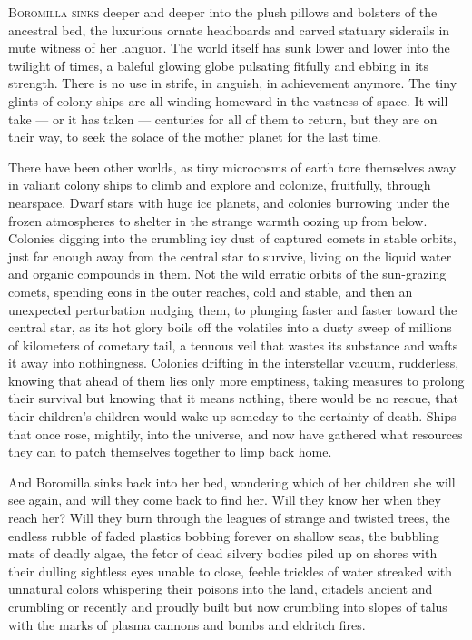 
\lettrine{B}{oromilla sinks} deeper and deeper into the plush pillows and bolsters of
the ancestral bed, the luxurious ornate headboards and carved statuary
siderails in mute witness of her languor. The world itself has sunk
lower and lower into the twilight of times, a baleful glowing globe
pulsating fitfully and ebbing in its strength. There is no use in
strife, in anguish, in achievement anymore. The tiny glints of colony
ships are all winding homeward in the vastness of space. It will take ---
or it has taken --- centuries for all of them to return, but they are on
their way, to seek the solace of the mother planet for the last time.

There have been other worlds, as tiny microcosms of earth tore
themselves away in valiant colony ships to climb and explore and
colonize, fruitfully, through nearspace. Dwarf stars with huge ice
planets, and colonies burrowing under the frozen atmospheres to shelter
in the strange warmth oozing up from below. Colonies digging into the
crumbling icy dust of captured comets in stable orbits, just far enough
away from the central star to survive, living on the liquid water and
organic compounds in them. Not the wild erratic orbits of the
sun-grazing comets, spending eons in the outer reaches, cold and stable,
and then an unexpected perturbation nudging them, to plunging faster and
faster toward the central star, as its hot glory boils off the volatiles
into a dusty sweep of millions of kilometers of cometary tail, a tenuous
veil that wastes its substance and wafts it away into nothingness.
Colonies drifting in the interstellar vacuum, rudderless, knowing that
ahead of them lies only more emptiness, taking measures to prolong their
survival but knowing that it means nothing, there would be no rescue,
that their children's children would wake up someday to the certainty of
death. Ships that once rose, mightily, into the universe, and now have
gathered what resources they can to patch themselves together to limp
back home.

And Boromilla sinks back into her bed, wondering which of her children
she will see again, and will they come back to find her. Will they know
her when they reach her? Will they burn through the leagues of strange
and twisted trees, the endless rubble of faded plastics bobbing forever
on shallow seas, the bubbling mats of deadly algae, the fetor of dead
silvery bodies piled up on shores with their dulling sightless eyes
unable to close, feeble trickles of water streaked with unnatural colors
whispering their poisons into the land, citadels ancient and crumbling
or recently and proudly built but now crumbling into slopes of talus
with the marks of plasma cannons and bombs and eldritch fires.

